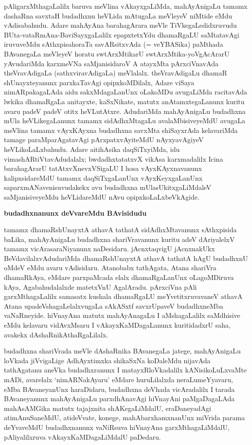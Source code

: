 pAligarxMthagaLalilx baruva meVlina vAkayxgaLiMda, mahAyAnigaLu tamamx dashaRna savxtaH budadhxnu heVLida mAtugaLa meVleyeV niMtide eMdu vAdisabahudu. Adare mahAyAna barahagArara meVle TiVkegaLedidxruvudu BUta-vataRmAna-BaviSayxgaLalilx epapxtetxYdu dhamaRgaLU saMtatavAgi iruvuveMdu sAthxpisahoraTa savARsitxvAda (= veYBASika) paMthada BAvanegaLa meVleyeV horatu swtArxMtikarU swtArxMtika-\-yoVgAcArarU yAvudariMda karxmeVNa saMjanisidaroV A atayxMta pArxciVnavAda theVravAdigaLa (sathxviravAdigaLa) meVlalalx. theVravAdigaLu dhamaR shUnayxteyanunx parxkaTa\-vAgi opipxkoMDilalx, Adare viSaya nimARpakagaLAda aidu sakxMdagaLanUnx oLakoMDu avugaLiMda racitavAda lwkika dhamaRgaLa anitayxte, kaSxNikate, matutx anAtamxtegaLanunx kuritu avaru padeV padeV otitx heVLutAtxre. AdudariMda mahAyAnigaLu \hbox{budadhxna} mUla heVLikegaLanunx tamamx sidAdhxMtagaLu avalaMbisiveyeMdU avugaLa meVlina tamamx vAyxKAyxna budadhxna savxMta shiSayxrAda kelavariMda tamage paraMparAgatavAgi pArxpatxvAyi\-teMdU nAyxyavAgiyeV heVLikoLaLxbahudu. Adare aitihAsika daqSiTxyiMda, idu vimashARtiVtavAdudalalx; bwdadhxtatatxvX vikAsa karxmadalilx Icina barahagArarU tatAtxvXnevxVSigaLU I hosa vAyxKAyxnavanunx kalipxsidareMdU tamamx daqSiTxgaLanUnx vAyxKeyxgaLanUnx saparx\-mANavenisuvudakekx avu budadhxna mUlasUkitxgaLiMdaleV saMjanisiveyeMdu heVLida\-reMdU nAvu opipxkoLaLxbeVkAgide.

\begin{center}
{\textbf{\Large budadhxnanunx deVvareMdu BAvisidudu}}
\end{center}

tamamx dhamaRshUnayxtA athavA tathatA sidAdhxMtavanunx sAthxpisida baLika, mahAyAnigaLu budadhxna shariVravanunx kuritu adeV dAriyalelxV tamamx vicArasaraNiyanunx naDesi\-daru. jAcnxtaqvigU jAcnxnakUkx BeVdavilalxvAdudariMda dhamaRshUnayxtA athavA tathatA hAgU budadhxnU oMdeV eMdu avaru vAdisidaru. Atanobabx tathAgata, Atana shariVra dhamaRkAya, eMdare parxpaMcada elalx dhamaRgaLanUnx oLagoMDiruva kAya, Aga\-bahudalalxde matetxVnU AgalAradu. pArxciVna pAli garxMthagaLalilx samasatx kushala dhamaRgaLU meYvetitxruvavaneV athavA Atana upadeVshagaLelalxvugaLa sAkASxtf savxrUpaveV budadhxneMba vaNaRneyide. hiVnayAna matutx mahAyAnagaLu I aMshagaLalilx saMdhisive eMdu kelavaru vidAvxMsaru I vAkayxKaMDagaLanunx kuritidadxrU saha, avakekx dAshaRnikAthaR\-gaLilalx.

\newpage

budadhxna shariVrada meVle dAshaRnika BAvanegaLa jatege, mahAyAnigaLu loVkada jiVvigaLige AdhAyxtimxka shikaSxNa koDaleMdu nijavAda tathAgatanu aneVka budadhxranunx I matayxRloVkadalilx kANisikoLuLxvaMte mADi, avarelalx `nimARNakAyaru' eMdare huruLilalxda neraLumeYyavaru, eMba BAvaneyanUnx haraDidaru, budadhxna deVhada vicAradalilx I tarada BAvaneyanunx mahAyAnigaLu parxdhAnavAgi hiVnayAni paMgaDagaLAda mahAsAMGika matutx tajajxnita shAKegaLiMdalU, eraDaneyadAgi atimAnuSaneMdU, atideVvate, konege, mahAbarxhamxnanUnx miVrida parama deYvaveMdU budadhxnanunx vaNiRsuva hiVnayAna garxMthagaLiMdalU, pAliyalilxruva vAkayxKaMDagaLiMdalU paDedaru.

